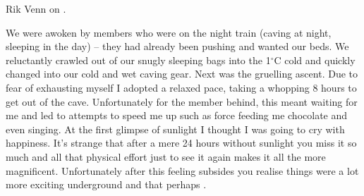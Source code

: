     \begin{marginfigure}
\checkoddpage \ifoddpage \forcerectofloat \else \forceversofloat \fi
\centering
 \caption{Rik Venn on \protect{}. }
 \label{rik skynet}
\end{marginfigure}


We were awoken by members who were on the night train (caving at night, sleeping in the day) --
they had already been pushing and wanted our beds. We reluctantly crawled out of our snugly sleeping
bags into the 1$^{\circ}$C cold and quickly changed into our cold and wet caving gear. Next was the gruelling
ascent. Due to fear of exhausting myself I adopted a relaxed pace, taking a whopping 8 hours to get
out of the cave. Unfortunately for the member behind, this meant waiting for me and led to attempts
to speed me up such as force feeding me chocolate and even singing. At the first glimpse of sunlight
I thought I was going to cry with happiness. It's strange that after a mere 24 hours without sunlight
you miss it so much and all that physical effort just to see it again makes it all the more magnificent.
Unfortunately after this feeling subsides you realise things were a lot more exciting underground and
that perhaps .


